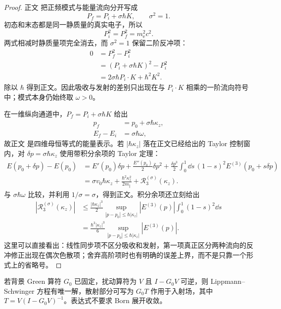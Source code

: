\begin{proof}
正文 把正频模式与能量流向分开写成
\[
P_f=P_i+\sigma\hbar K,
\qquad \sigma^2=1.
\]
初态和末态都是同一静质量的真实电子，所以
\[
P_i^2=P_f^2=m_{\mathrm e}^2c^2.
\]
两式相减时静质量项完全消去，而 $\sigma^2=1$ 保留二阶反冲项：
\begin{align*}
0
&=P_f^2-P_i^2\\
&=(P_i+\sigma\hbar K)^2-P_i^2\\
&=2\sigma\hbar P_i\!\cdot K+\hbar^2K^2.
\end{align*}
除以 $\hbar$ 得到正文。因此吸收与发射的差别只出现在与 $P_i\!\cdot K$ 相乘的一阶流向符号中；模式本身仍始终取 $\omega>0$。

在一维纵向通道中，$P_f=P_i+\sigma\hbar K$ 给出
\begin{align*}
p_f&=p_0+\sigma\hbar\kappa_z,\\
E_f-E_i&=\sigma\hbar\omega,
\end{align*}
故正文 是四维母恒等式的能量表示。若 $|\hbar\kappa_z|$ 落在正文已经给出的 Taylor 控制窗内，对
$\delta p=\sigma\hbar\kappa_z$ 使用带积分余项的 Taylor 定理：
\begin{align*}
E(p_0+\delta p)-E(p_0)
&=E'(p_0)\delta p
+\frac{E''(p_0)}{2}\delta p^2
+\frac{\delta p^3}{2}
\int_0^1\dd s\,(1-s)^2E^{(3)}(p_0+s\delta p)\\
&=\sigma v_0\hbar\kappa_z
+\frac{\hbar^2\kappa_z^2}{2m_\parallel}
+\mathcal R_3^{(\sigma)}(\kappa_z).
\end{align*}
与 $\sigma\hbar\omega$ 比较，并利用 $1/\sigma=\sigma$，得到正文。积分余项还立刻给出
\begin{align*}
\left|\mathcal R_3^{(\sigma)}(\kappa_z)\right|
&\le
\frac{|\hbar\kappa_z|^3}{2}
\sup_{|p-p_0|\le\hbar|\kappa_z|}|E^{(3)}(p)|
\int_0^1(1-s)^2\dd s\\
&=\frac{\hbar^3|\kappa_z|^3}{6}
\sup_{|p-p_0|\le\hbar|\kappa_z|}|E^{(3)}(p)|.
\end{align*}
这里可以直接看出：线性同步项不区分吸收和发射，第一项真正区分两种流向的反冲修正出现在偶次色散项；舍弃高阶项时也有明确的误差上界，而不是只靠一个形式上的省略号。
\end{proof}

\begin{proposition}
若背景 Green 算符 $G_0$ 已固定，扰动算符为 $V$ 且 $I-G_0V$ 可逆，则 Lippmann--Schwinger 方程有唯一解，散射部分可写为 $G_0T$ 作用于入射场，其中 $T=V(I-G_0V)^{-1}$。表达式不要求 Born 展开收敛。
\end{proposition}

